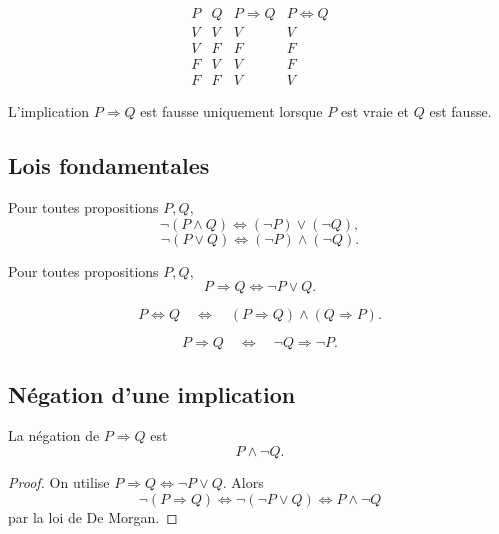 \documentclass[11pt,a4paper]{article}
\newcommand{\non}{\neg}
\newcommand{\et}{\wedge}
\newcommand{\ou}{\vee}
\newcommand{\imp}{\Rightarrow}
\newcommand{\ssi}{\Longleftrightarrow}
\begin{document}
\begin{center}
\[
\begin{array}{c|c|c|c}
P&Q&P\imp Q&P\ssi Q\\
\hline
V&V&V&V\\
V&F&F&F\\
F&V&V&F\\
F&F&V&V
\end{array}
\]
\end{center}

\begin{retenirbox}
L'implication \(P\imp Q\) est fausse uniquement lorsque \(P\) est vraie et \(Q\) est fausse.
\end{retenirbox}

\subsection{Lois fondamentales}

\begin{propositionbox}
Pour toutes propositions \(P,Q\),
\[
\non(P\et Q)\ssi(\non P)\ou(\non Q),
\]
\[
\non(P\ou Q)\ssi(\non P)\et(\non Q).
\]
\end{propositionbox}

\begin{propositionbox}[implication]
Pour toutes propositions \(P,Q\),
\[
P\imp Q\ssi \non P\ou Q.
\]
\end{propositionbox}

\begin{propositionbox}
\[
P\ssi Q \quad\ssi\quad (P\imp Q)\et(Q\imp P).
\]
\end{propositionbox}

\begin{propositionbox}[contraposée]
\[
P\imp Q \quad\ssi\quad \non Q\imp\non P.
\]
\end{propositionbox}

\subsection{Négation d'une implication}

\begin{propositionbox}
La négation de \(P\imp Q\) est
\[
P\et\non Q.
\]
\end{propositionbox}

\begin{proof}
On utilise \(P\imp Q\ssi\non P\ou Q\). Alors
\[
\non(P\imp Q)\ssi\non(\non P\ou Q)\ssi P\et\non Q
\]
par la loi de De Morgan.
\end{proof}
\end{document}
